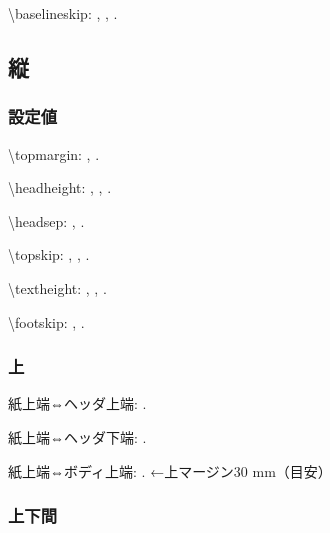 \documentclass{FITpaper}
\begin{document}
\textbackslash baselineskip:
\prntlen{\baselineskip},
\prntlen{\baselineskip},
\prntlen{\baselineskip}.

\subsection{縦}

\subsubsection{設定値}

\textbackslash topmargin:
\prntlen{\topmargin},
\prntlen{\topmargin}.

\textbackslash headheight:
\prntlen{\headheight},
\prntlen{\headheight},
\prntlen{\headheight}.

\textbackslash headsep:
\prntlen{\headsep},
\prntlen{\headsep}.

\textbackslash topskip:
\prntlen{\topskip},
\prntlen{\topskip},
\prntlen{\topskip}.

\textbackslash textheight:
\prntlen{\textheight},
\prntlen{\textheight},
\prntlen{\textheight}.

\textbackslash footskip:
\prntlen{\footskip},
\prntlen{\footskip}.

\subsubsection{上}

\newlength{\mytop}
\setlength{\mytop}{\topmargin}

\addtolength{\mytop}{1in}

紙上端⇔ヘッダ上端:
\prntlen{\mytop}.

\addtolength{\mytop}{\headheight}

紙上端⇔ヘッダ下端:
\prntlen{\mytop}.

\addtolength{\mytop}{\headsep}

紙上端⇔ボディ上端:
\prntlen{\mytop}.
←上マージン30 mm（目安）

\subsubsection{上下間}
\end{document}
